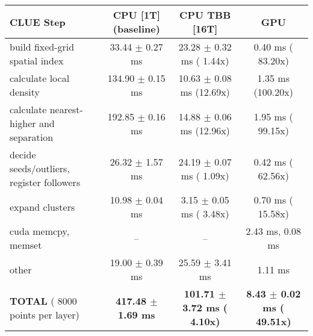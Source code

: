     \begin{tabular}{l|c|c|c}
    \hline
    CLUE Step                                 & CPU [1T] (baseline)         & CPU TBB [16T]                         & GPU                       \\ \hline
    build fixed-grid spatial index            &  33.44 $\pm$  0.27 ms       &  23.28 $\pm$  0.32 ms ( 1.44x)        &   0.40 ms ( 83.20x)       \\
    calculate local density                   & 134.90 $\pm$  0.15 ms       &  10.63 $\pm$  0.08 ms (12.69x)        &   1.35 ms (100.20x)       \\
    calculate nearest-higher and separation   & 192.85 $\pm$  0.16 ms       &  14.88 $\pm$  0.06 ms (12.96x)        &   1.95 ms ( 99.15x)       \\
    decide seeds/outliers, register followers &  26.32 $\pm$  1.57 ms       &  24.19 $\pm$  0.07 ms ( 1.09x)        &   0.42 ms ( 62.56x)       \\
    expand clusters                           &  10.98 $\pm$  0.04 ms       &   3.15 $\pm$  0.05 ms ( 3.48x)        &   0.70 ms ( 15.58x)       \\ \hline
    cuda memcpy, memset                       & --                          & --                                    &   2.43 ms,   0.08 ms      \\ 
    other                                     &  19.00 $\pm$  0.39 ms       &  25.59 $\pm$  3.41 ms                 &   1.11 ms                 \\ \hline
    \textbf{TOTAL} ( 8000 points per layer)   & \textbf{417.48 $\pm$  1.69 ms} & \textbf{101.71 $\pm$  3.72 ms ( 4.10x)} & \textbf{  8.43 $\pm$  0.02 ms ( 49.51x)}  \\
    \hline 
    \end{tabular}
    \linebreak



